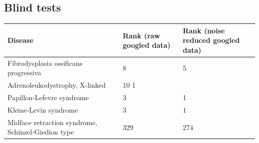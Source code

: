 \documentclass[10pt,letterpaper,final]{article}
\begin{document}
\newpage
\subsection{Blind tests}

\begin{center}
\begin{small}
	\begin{tabular}{|p{3.5cm}|p{1.8cm}|p{1.8cm}|}
	\hline
	\textbf{Disease}  & \textbf{Rank (raw googled data)} & \textbf{Rank (noise reduced googled data)} \\
	\hline\hline
    Fibrodysplasia ossificans progressiva & 8 & 5\\
    \hline
    Adrenoleukodystrophy, X-linked & 10 1& \\
    \hline
    Papillon-Lefevre syndrome & 3 & 1\\
    \hline
    Kleine-Levin syndrome  & 3 & 1\\
    \hline
    Midface retraction syndrome, Schinzel-Giedion type  & 329 & 274\\
    \hline
	\end{tabular}
\label{tab:results_blindtest}
\end{small}
\end{center}
\end{document}
